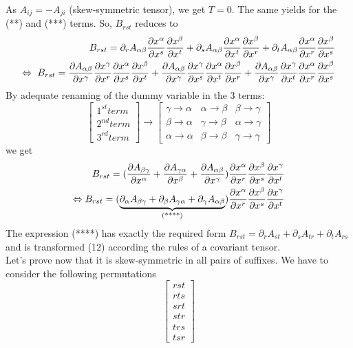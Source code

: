 As $A_{ij} = - A_{ji}$ (skew-symmetric tensor), we get $T=0$. The same yields for the (**) and (***) terms. So, $B_{rst}$ reduces to
\begin{align}
\ B_{rst} = \partial_{r}{A_{\alpha\beta}}\pdv{x^{\alpha}}{x^{s}}\pdv{x^{\beta}}{x^{t}}+ 
\partial_{s}{A_{\alpha\beta}}\pdv{x^{\alpha}}{x^{t}}\pdv{x^{\beta}}{x^{r}}+
\partial_{t}{A_{\alpha\beta}}\pdv{x^{\alpha}}{x^{r}}\pdv{x^{\beta}}{x^{s}}\\
\Leftrightarrow \ B_{rst} = \pdv{A_{\alpha\beta}}{x^{\gamma}}\pdv{x^{\gamma}}{x^{r}}\pdv{x^{\alpha}}{x^{s}}\pdv{x^{\beta}}{x^{t}}+ 
\pdv{A_{\alpha\beta}}{x^{\gamma}}\pdv{x^{\gamma}}{x^{s}}\pdv{x^{\alpha}}{x^{t}}\pdv{x^{\beta}}{x^{r}}+
\pdv{A_{\alpha\beta}}{x^{\gamma}}\pdv{x^{\gamma}}{x^{t}}\pdv{x^{\alpha}}{x^{r}}\pdv{x^{\beta}}{x^{s}}
\end{align}
By adequate renaming of the dummy variable in the 3 terms:
$$  \left[ {\begin{array}{c}
    1^{st} term \\
    2^{nd} term  \\
    3^{rd} term  
  \end{array} } \right]
\longrightarrow
  \left[ {\begin{array}{ccc}
    \gamma \to \alpha & \alpha \to \beta & \beta \to \gamma \\
    \beta \to \alpha & \gamma \to \beta & \alpha \to \gamma \\
    \alpha \to \alpha & \beta \to \beta & \gamma \to \gamma 
  \end{array} } \right]
$$
we get
\begin{align}
\ B_{rst} = (\pdv{A_{\beta\gamma}}{x^{\alpha}}+\pdv{A_{\gamma\alpha}}{x^{\beta}}+\pdv{A_{\alpha\beta}}{x^{\gamma}})\pdv{x^{\alpha}}{x^{r}}\pdv{x^{\beta}}{x^{s}}\pdv{x^{\gamma}}{x^{t}}\\
\Leftrightarrow  B_{rst} = (\underbrace{\partial_{\alpha}{A_{\beta\gamma}}+\partial_{\beta}{A_{\gamma\alpha}}+\partial_{\gamma}{A_{\alpha\beta}}}_\text{(****)})\pdv{x^{\alpha}}{x^{r}}\pdv{x^{\beta}}{x^{s}}\pdv{x^{\gamma}}{x^{t}}
\end{align}
The expression (****) has exactly the required form $B_{rst} = \partial_{r}{A_{st}} + \partial_{s}{A_{tr}} +\partial_{t}{A_{rs}} $ and is transformed (12) according the rules of a covariant tensor.\\
Let's prove now that it is skew-symmetric in all pairs of suffixes.
We have to consider the following permutations
$$  \left[ {\begin{array}{c}
    rst \\
    rts\\
    srt  \\
    str\\  
    trs \\
    tsr
  \end{array} } \right]$$
  
